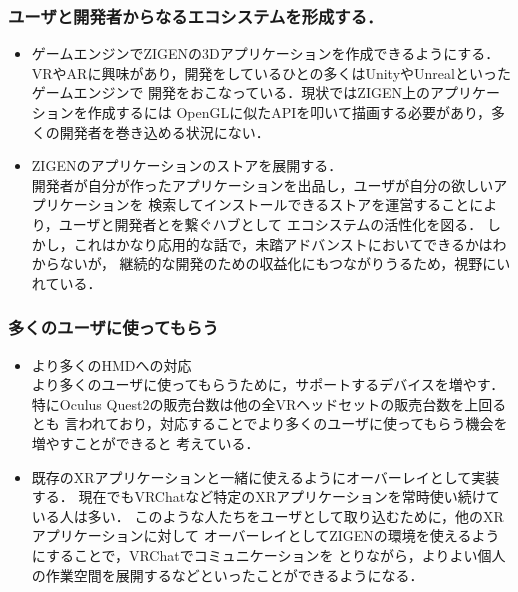 \subsubsection*{ユーザと開発者からなるエコシステムを形成する．}

\begin{itemize}
  \item ゲームエンジンでZIGENの3Dアプリケーションを作成できるようにする．\\
        VRやARに興味があり，開発をしているひとの多くはUnityやUnrealといったゲームエンジンで
        開発をおこなっている．現状ではZIGEN上のアプリケーションを作成するには
        OpenGLに似たAPIを叩いて描画する必要があり，多くの開発者を巻き込める状況にない．

  \item ZIGENのアプリケーションのストアを展開する．\\
        開発者が自分が作ったアプリケーションを出品し，ユーザが自分の欲しいアプリケーションを
        検索してインストールできるストアを運営することにより，ユーザと開発者とを繋ぐハブとして
        エコシステムの活性化を図る．
        しかし，これはかなり応用的な話で，未踏アドバンストにおいてできるかはわからないが，
        継続的な開発のための収益化にもつながりうるため，視野にいれている．
\end{itemize}

\subsubsection*{多くのユーザに使ってもらう}

\begin{itemize}
  \item より多くのHMDへの対応\\
        より多くのユーザに使ってもらうために，サポートするデバイスを増やす．
        特にOculus Quest2の販売台数は他の全VRヘッドセットの販売台数を上回るとも
        言われており，対応することでより多くのユーザに使ってもらう機会を増やすことができると
        考えている．

  \item 既存のXRアプリケーションと一緒に使えるようにオーバーレイとして実装する．
        現在でもVRChatなど特定のXRアプリケーションを常時使い続けている人は多い．
        このような人たちをユーザとして取り込むために，他のXRアプリケーションに対して
        オーバーレイとしてZIGENの環境を使えるようにすることで，VRChatでコミュニケーションを
        とりながら，よりよい個人の作業空間を展開するなどといったことができるようになる．
\end{itemize}

